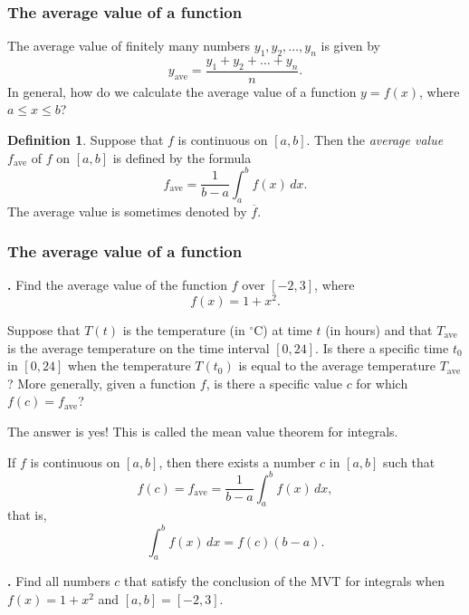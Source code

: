 \documentclass[t]{beamer}
\theoremstyle{plain}
\theoremstyle{definition}
\newtheorem{dfn}{Definition}
\newcounter{heading}
\newcommand{\newhead}[1]{\medskip\stepcounter{heading}\noindent\textbf{\hspace{0.2cm}{#1}.}}
\begin{document}
\begin{frame}
\frametitle{The average value of a function}

\noindent The average value of finitely many numbers $y_1,y_2,\ldots,y_n$ is given by
\[y_{\mathrm{ave}}=\frac{y_1+y_2+\ldots+y_n}{n}.\]
 In general, how do we calculate the average value of a function $y = f(x)$, where $a \leq x \leq b$?\pause
%

\begin{dfn} Suppose that $f$ is continuous on $[a,b]$. Then the \textit{average value} $f_{\mathrm{ave}}$ of $f$ on $[a,b]$ is defined by the formula
\[f_{\textrm{ave}} = \frac{1}{b-a}\int_{a}^{b}f(x)\, dx.\]
The average value is sometimes denoted by $\overline{f}$.\end{dfn}

\end{frame}

\begin{frame}
\frametitle{The average value of a function}
\newhead{Example} Find the average value of the function $f$ over $[-2,3]$, where
\[f(x)=1+x^2.\]
\end{frame}

\begin{frame}
\noindent Suppose that $T(t)$ is the temperature (in ${}^{\circ}$C) at time $t$ (in hours) and that $T_{\mathrm{ave}}$ is the average temperature on the time interval $[0,24]$. Is there a specific time $t_0$ in $[0,24]$ when the temperature $T(t_0)$ is equal to the average temperature $T_{\mathrm{ave}}$?  More generally, given a function $f$, is there a specific value $c$ for which $f(c)=f_{\mathrm{ave}}$?\pause

\medskip

\noindent The answer is yes!  This is called the mean value theorem for integrals.\pause

\begin{theorem}
If $f$ is continuous on $[a,b]$, then there exists a number $c$ in $[a,b]$ such that
\[f(c) = f_{\textrm{ave}} = \frac{1}{b-a}\int_{a}^{b}f(x)\,dx,\]
that is,
\[ \int_{a}^{b}f(x)\,dx = f(c)(b-a).\]
\end{theorem} 

\end{frame}

\begin{frame}
\newhead{Example} Find all numbers $c$ that satisfy the conclusion of the MVT for integrals when $f(x)=1+x^2$ and $[a,b]=[-2,3]$.
\end{frame}
\end{document}
